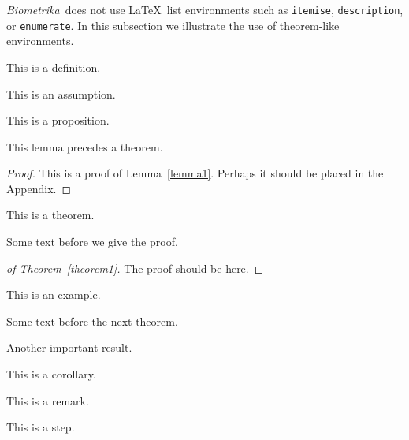 \documentclass[supplementary,lineno]{biometrika}
\def\Bka{{\it Biometrika}}
\begin{document}
\Bka\ does not use \LaTeX\ list environments such as \texttt{itemise}, \texttt{description}, or \texttt{enumerate}.
In this subsection we illustrate the use of theorem-like environments.

\begin{definition}
This is a definition.
\end{definition}

\begin{assumption}
\label{assumptionA}
This is an assumption. 
\end{assumption}

\begin{proposition}
This is a proposition.
\end{proposition}

\begin{lemma}
\label{lemma1}
This lemma precedes a theorem.
\end{lemma}

\begin{proof}
This is a proof of Lemma~\ref{lemma1}.  Perhaps it should be placed in the Appendix.
\end{proof}

\begin{theorem}
\label{theorem1}
This is a theorem.
\end{theorem}

Some text before we give the proof.

\begin{proof}[of Theorem~\ref{theorem1}]
The proof should be here.
\end{proof}

\begin{example}
This is an example.
\end{example}

Some text before the next theorem.

\begin{theorem}
Another important result.
\end{theorem}

\begin{corollary}
This is a corollary.
\end{corollary}

\begin{remark}
This is a remark.
\end{remark}

\begin{step}
This is a step.
\end{step}
\end{document}
